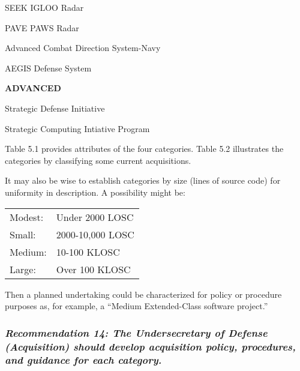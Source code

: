 \documentclass[12pt,final]{article}
\begin{document}
\begin{landscape}
\begin{center}
\begin{multicols*}{4}
    SEEK IGLOO Radar

    PAVE PAWS Radar

    Advanced Combat Direction System-Navy

    AEGIS Defense System

    \columnbreak

    \textbf{ADVANCED}

    Strategic Defense Initiative

    Strategic Computing Intiative Program

\end{multicols*}
\end{center}

\end{landscape}

Table 5.1 provides attributes of the four categories. Table 5.2 illustrates the
categories by classifying some current acquisitions.

It may also be wise to establish categories by size (lines of source code) for
uniformity in description. A possibility might be:

\begin{center}
    \begin{tabular}{ l l }
Modest: & Under 2000 LOSC\\

Small: & 2000-10,000 LOSC\\

Medium: & 10-100 KLOSC\\

Large: & Over 100 KLOSC\\
    \end{tabular}
\end{center}

Then a planned undertaking could be characterized for policy or procedure purposes
as, for example, a “Medium Extended-Class software project.”


\subsubsection*{\textit{Recommendation 14: The Undersecretary of Defense
(Acquisition) should develop acquisition policy, procedures, and guidance for
each category.}}
\end{document}
